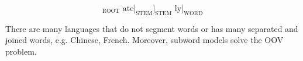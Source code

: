 \begin{equation}
[[\text{un }[[\text{fortun(e)}]_{\text{ROOT}} \text{ ate}]_{\text{STEM}}]_{\text{STEM}}\text{ ly}]_{\text{WORD}} \nonumber
\end{equation}

There are many languages that do not segment words or has many separated and joined words, e.g. Chinese, French.
Moreover, subword models solve the OOV problem.